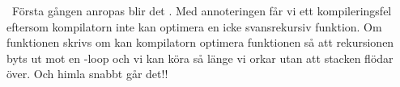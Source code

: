 \SOLUTION

\TaskSolved \what~Första gången   anropas blir det . Med annoteringen  får vi ett kompileringsfel eftersom kompilatorn inte kan optimera en icke svansrekursiv funktion. Om funktionen skrivs om kan kompilatorn optimera funktionen så att rekursionen byts ut mot en -loop och vi kan köra så länge vi orkar utan att stacken flödar över. Och himla snabbt går det!!

\QUESTEND
